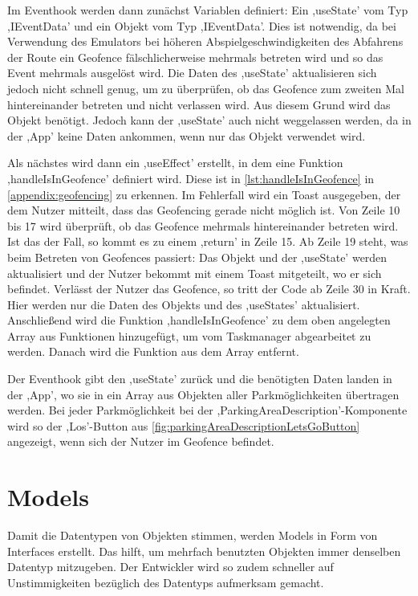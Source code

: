 Im Eventhook werden dann zunächst Variablen definiert: Ein ,useState' vom Typ ,IEventData' und ein Objekt vom Typ ,IEventData'. Dies ist notwendig, da bei Verwendung des Emulators bei höheren Abspielgeschwindigkeiten des Abfahrens der Route ein Geofence fälschlicherweise mehrmals betreten wird und so das Event mehrmals ausgelöst wird. Die Daten des ,useState' aktualisieren sich jedoch nicht schnell genug, um zu überprüfen, ob das Geofence zum zweiten Mal hintereinander betreten und nicht verlassen wird. Aus diesem Grund wird das Objekt benötigt. Jedoch kann der ,useState' auch nicht weggelassen werden, da in der ,App' keine Daten ankommen, wenn nur das Objekt verwendet wird. 

Als nächstes wird dann ein ,useEffect' erstellt, in dem eine Funktion ,handleIsInGeofence' definiert wird. Diese ist in \autoref{lst:handleIsInGeofence} in \autoref{appendix:geofencing} zu erkennen. Im Fehlerfall wird ein Toast ausgegeben, der dem Nutzer mitteilt, dass das Geofencing gerade nicht möglich ist. Von Zeile 10 bis 17 wird überprüft, ob das Geofence mehrmals hintereinander betreten wird. Ist das der Fall, so kommt es zu einem ,return' in Zeile 15. Ab Zeile 19 steht, was beim Betreten von Geofences passiert: Das Objekt und der ,useState' werden aktualisiert und der Nutzer bekommt mit einem Toast mitgeteilt, wo er sich befindet. Verlässt der Nutzer das Geofence, so tritt der Code ab Zeile 30 in Kraft. Hier werden nur die Daten des Objekts und des ,useStates' aktualisiert. Anschließend wird die Funktion ,handleIsInGeofence' zu dem oben angelegten Array aus Funktionen hinzugefügt, um vom Taskmanager abgearbeitet zu werden. Danach wird die Funktion aus dem Array entfernt.

Der Eventhook gibt den ,useState' zurück und die benötigten Daten landen in der ,App', wo sie in ein Array aus Objekten aller Parkmöglichkeiten übertragen werden. Bei jeder Parkmöglichkeit bei der ,ParkingAreaDescription'-Komponente wird so der ,Los'-Button aus \autoref{fig:parkingAreaDescriptionLetsGoButton} angezeigt, wenn sich der Nutzer im Geofence befindet.

\section{Models}
Damit die Datentypen von Objekten stimmen, werden Models in Form von Interfaces erstellt. Das hilft, um mehrfach benutzten Objekten immer denselben Datentyp mitzugeben. Der Entwickler wird so zudem schneller auf Unstimmigkeiten bezüglich des Datentyps aufmerksam gemacht.


